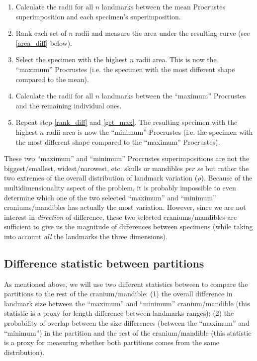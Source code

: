 \documentclass[a4paper,11pt]{article}
\begin{document}
\begin{enumerate}

 \item \label{mean_diff} Calculate the radii for all $n$ landmarks between the mean Procrustes superimposition and each specimen's superimposition.
 \item \label{rank_diff} Rank each set of $n$ radii and measure the area under the resulting curve (see \ref{area_diff} below).
 \item \label{get_max} Select the specimen with the highest $n$ radii area. This is now the ``maximum'' Procrustes (i.e. the specimen with the most different shape compared to the mean).
 \item \label{max_diff} Calculate the radii for all $n$ landmarks between the ``maximum'' Procrustes and the remaining individual ones.
 \item \label{min_diff} Repeat step \ref{rank_diff} and \ref{get_max}. The resulting specimen with the highest $n$ radii area is now the ``minimum'' Procrustes (i.e. the specimen with the most different shape compared to the ``maximum'' Procrustes).

\end{enumerate}

These two ``maximum'' and ``minimum'' Procrustes superimpositions are not the biggest/smallest, widest/narowest, etc. skulls or mandibles \textit{per se} but rather the two extremes of the overall distribution of landmark variation ($\rho$).
Because of the multidimensionality aspect of the problem, it is probably impossible to even determine which one of the two selected ``maximum'' and ``minimum'' craniums/mandibles has actually the most variation.
However, since we are not interest in \textit{direction} of difference, these two selected craniums/mandibles are sufficient to give us the magnitude of differences between specimens (while taking into account \textit{all} the landmarks the three dimensions).

\subsection{Difference statistic between partitions}

As mentioned above, we will use two different statistics between to compare the partitions to the rest of the cranium/mandible: (1) the overall difference in landmark size between the ``maximum'' and ``minimum'' cranium/mandible (this statistic is a proxy for length difference between landmarks ranges); (2) the probability of overlap between the size differences (between the ``maximum'' and ``minimum'') in the partition and the rest of the cranium/mandible (this statistic is a proxy for measuring whether both partitions comes from the same distribution).
\end{document}
